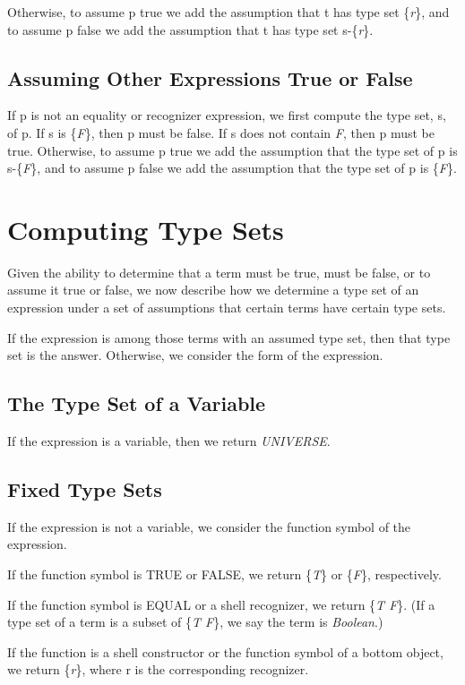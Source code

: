 \documentclass[11pt]{book}
\newcommand{\pubinlineunderline}[1]{\emph{#1}}
\newcommand{\pubdefaulttextsize}{\large}
\begin{document}
Otherwise, to assume p true we add the assumption
that t has type set \{\pubinlineunderline{r}\}, and to assume p false we add the assumption
that t has type set s-\{\pubinlineunderline{r}\}.
\subsection{Assuming Other Expressions True or False}
\pubdefaulttextsize
If p is not an equality or recognizer expression, we first
compute the type set, s, of p.  If s is \{\pubinlineunderline{F}\},
then p must be false.  If s does not contain \pubinlineunderline{F}, then p must be true.
Otherwise, to assume p true we add the assumption that the type set of
p is s-\{\pubinlineunderline{F}\}, and to assume p false we add the assumption that the type
set of p is \{\pubinlineunderline{F}\}.
\section{Computing Type Sets}
\pubdefaulttextsize
Given the ability to determine that a term must be true, must be false,
or to assume it true or false, we now describe how we determine a type
set of an expression
under a set of assumptions that certain terms have
certain type sets.

If the expression is among those terms
with an assumed type set, then that type set is the answer.  Otherwise, we
consider the form of the expression.  
\subsection{The Type Set of a Variable}
\pubdefaulttextsize
If the expression is a variable, then we return \pubinlineunderline{UNIVERSE}.
\subsection{Fixed Type Sets}
\pubdefaulttextsize
If the expression is not a variable, we consider the function
symbol of the expression.

If the function symbol is TRUE or FALSE, we return \{\pubinlineunderline{T}\} or \{\pubinlineunderline{F}\}, respectively.

If the function symbol is EQUAL or a shell recognizer,
we return \{\pubinlineunderline{T F}\}.  (If a type set of a term is a subset of \{\pubinlineunderline{T F}\}, we say
the term is \pubinlineunderline{Boolean}.)

If the function is a  shell constructor or the function symbol
of a  bottom object, we return \{\pubinlineunderline{r}\}, 
where r is the corresponding recognizer.
\end{document}
